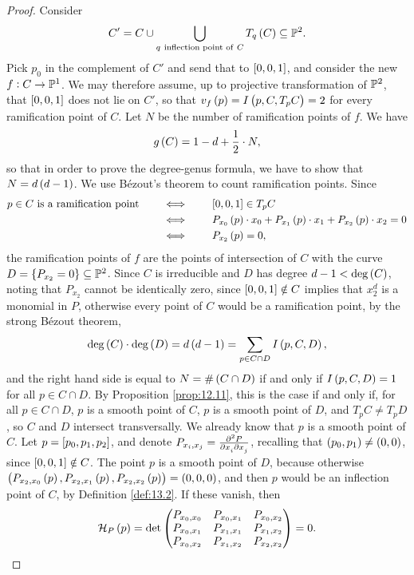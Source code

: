 \begin{proof}
Consider
$$ C' = C \cup \bigcup_{q \ \text{inflection point of} \ C} T_q\br{C} \subseteq \P^2. $$
Pick $ p_0 $ in the complement of $ C' $ and send that to $ \sbr{0, 0, 1} $, and consider the new $ f : C \to \P^1 $. We may therefore assume, up to projective transformation of $ \P^2 $, that $ \sbr{0, 0, 1} $ does not lie on $ C' $, so that $ v_f\br{p} = I\br{p, C, T_pC} = 2 $ for every ramification point of $ C $. Let $ N $ be the number of ramification points of $ f $. We have
$$ g\br{C} = 1 - d + \dfrac{1}{2} \cdot N, $$
so that in order to prove the degree-genus formula, we have to show that $ N = d\br{d - 1} $. We use B\'ezout's theorem to count ramification points. Since
\begin{align*}
p \in C \ \text{is a ramification point} \qquad
& \iff \qquad \sbr{0, 0, 1} \in T_pC \\
& \iff \qquad P_{x_0}\br{p} \cdot x_0 + P_{x_1}\br{p} \cdot x_1 + P_{x_2}\br{p} \cdot x_2 = 0 \\
& \iff \qquad P_{x_2}\br{p} = 0,
\end{align*}
the ramification points of $ f $ are the points of intersection of $ C $ with the curve $ D = \cbr{P_{x_2} = 0} \subseteq \P^2 $. Since $ C $ is irreducible and $ D $ has degree $ d - 1 < \deg\br{C} $, noting that $ P_{x_2} $ cannot be identically zero, since $ \sbr{0, 0, 1} \notin C $ implies that $ x_2^d $ is a monomial in $ P $, otherwise every point of $ C $ would be a ramification point, by the strong B\'ezout theorem,
$$ \deg\br{C} \cdot \deg\br{D} = d\br{d - 1} = \sum_{p \in C \cap D} I\br{p, C, D}, $$
and the right hand side is equal to $ N = \#\br{C \cap D} $ if and only if $ I\br{p, C, D} = 1 $ for all $ p \in C \cap D $. By Proposition \ref{prop:12.11}, this is the case if and only if, for all $ p \in C \cap D $, $ p $ is a smooth point of $ C $, $ p $ is a smooth point of $ D $, and $ T_pC \ne T_pD $, so $ C $ and $ D $ intersect transversally. We already know that $ p $ is a smooth point of $ C $. Let $ p = \sbr{p_0, p_1, p_2} $, and denote $ P_{x_i, x_j} = \tmd{P}{2}{x_i}{}{x_j}{} $, recalling that $ \br{p_0, p_1} \ne \br{0, 0} $, since $ \sbr{0, 0, 1} \notin C $. The point $ p $ is a smooth point of $ D $, because otherwise $ \br{P_{x_2, x_0}\br{p}, P_{x_2, x_1}\br{p}, P_{x_2, x_2}\br{p}} = \br{0, 0, 0} $, and then $ p $ would be an inflection point of $ C $, by Definition \ref{def:13.2}. If these vanish, then
$$ \HH_P\br{p} = \det\threebythree{P_{x_0, x_0}}{P_{x_0, x_1}}{P_{x_0, x_2}}{P_{x_0, x_1}}{P_{x_1, x_1}}{P_{x_1, x_2}}{P_{x_0, x_2}}{P_{x_1, x_2}}{P_{x_2, x_2}} = 0. $$

\end{proof}
